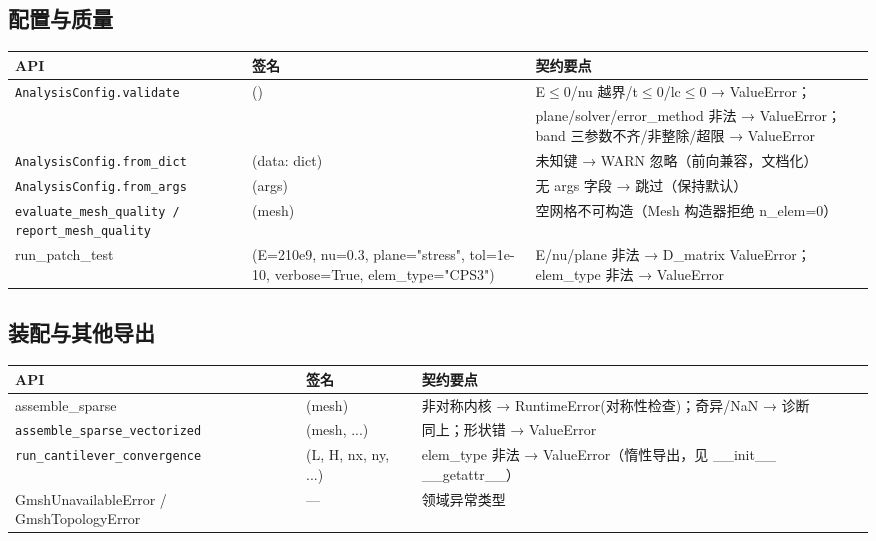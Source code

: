 \documentclass[12pt,a4paper]{ctexart}
\begin{document}
\subsection{配置与质量}

\begin{longtable}{p{4.2cm}p{4.0cm}p{6.0cm}}
\toprule
\textbf{API} & \textbf{签名} & \textbf{契约要点} \\
\midrule
\texttt{AnalysisConfig.\newline validate} & () & E$\leq$0/nu 越界/t$\leq$0/lc$\leq$0 → ValueError；\\ & & plane/solver/error\_method 非法 → ValueError；band 三参数不齐/非整除/超限 → ValueError \\
\texttt{AnalysisConfig.\newline from\_dict} & (data: dict) & 未知键 → WARN 忽略（前向兼容，文档化） \\
\texttt{AnalysisConfig.\newline from\_args} & (args) & 无 args 字段 → 跳过（保持默认） \\
\texttt{evaluate\_mesh\_\newline quality / report\_\newline mesh\_quality} & (mesh) & 空网格不可构造（Mesh 构造器拒绝 n\_elem=0） \\
run\_patch\_test & (E=210e9, nu=0.3, plane="stress", tol=1e-10, verbose=True, elem\_type="CPS3") & E/nu/plane 非法 → D\_matrix ValueError；elem\_type 非法 → ValueError \\
\bottomrule
\end{longtable}

\subsection{装配与其他导出}

\begin{longtable}{p{4.2cm}p{4.0cm}p{6.0cm}}
\toprule
\textbf{API} & \textbf{签名} & \textbf{契约要点} \\
\midrule
assemble\_sparse & (mesh) & 非对称内核 → RuntimeError(对称性检查)；奇异/NaN → 诊断 \\
\texttt{assemble\_sparse\_\newline vectorized} & (mesh, ...) & 同上；形状错 → ValueError \\
\texttt{run\_cantilever\_\newline convergence} & (L, H, nx, ny, ...) & elem\_type 非法 → ValueError（惰性导出，见 \_\_init\_\_ \_\_getattr\_\_） \\
GmshUnavailableError / GmshTopologyError & — & 领域异常类型 \\
\bottomrule
\end{longtable}
\end{document}
